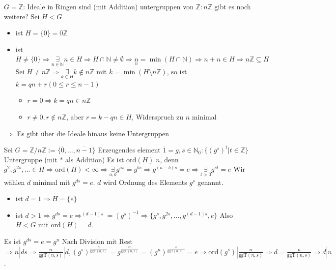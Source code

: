 \documentclass{article}
\newcommand{\N}{\mathbb{N}}
\newcommand{\Z}{\mathbb{Z}}
\newcommand{\ggT}{\text{ggT}}
\newcommand{\ord}{\text{ord}}
\begin{document}
$G=\Z$: Ideale in Ringen sind (mit Addition) untergruppen
von $\Z:n\Z$ gibt es noch weitere?
Sei $H<G$
\begin{itemize}
    \item ist $H=\{0\}=0\Z$
    \item ist $H\neq\{0\}\Rightarrow\underset{n\in\N}
        \exists n\in H\Rightarrow H\cap\N\neq\emptyset
        \Rightarrow\underset{n}n=\min(H\cap\N)
        \Rightarrow n+n\in H\Rightarrow n\Z\subseteq H$\\
        Sei $H\neq n\Z\Rightarrow\underset{k\in H}\exists
        k\notin n\Z$ mit $k=\min(H\setminus n\Z)$,
        so ist $k=qn+r(0\leq r\leq n-1)$
        \begin{itemize}
            \item $r=0\Rightarrow k=qn\in n\Z$
            \item $r\neq 0,r\notin n\Z$, aber
            $r=k-qn\in H$, Widerspruch zu $n$ minimal
        \end{itemize}
\end{itemize}
$\Rightarrow$ Es gibt über die Ideale hinaus keine
Untergruppen

Sei $G=\Z/n\Z:=\{\overline{0},\hdots,\overline{n-1}\}$
Erzeugendes element $\overline{1}=g,s\in\N_0:
\{(g^s)^t|t\in\Z\}$ Untergruppe (mit $*$ als Addition)
Es ist $\ord(H)|n$, denn $g^2,g^{2s},\hdots\in H\Rightarrow
\ord(H)<\infty\Rightarrow\underset{a,b}\exists g^{as}=g^{bs}
\Rightarrow g^{(a-b)s}=e\Rightarrow\underset{t>0}\exists
g^{st}=e$ Wir wählen $d$ minimal mit $g^{ds}=e$. $d$
wird Ordnung des Elements $g^{s}$ genannt.
\begin{itemize}
    \item ist $d=1\Rightarrow H=\{e\}$
    \item ist $d>1\Rightarrow g^{ds}=e\Rightarrow^{(d-1)s}
    =(g^s)^{-1}\Rightarrow\{g^s,g^{2s},\hdots,g^{(d-1)s},e\}$
    Also $H<G$ mit $\ord(H)=d$.
\end{itemize}
Es ist $g^{ds}=e=g^n$ Nach Division mit Rest
$\Rightarrow n|ds\Rightarrow \frac{n}{\ggT(n,s)}|d,
(g^s)^{\frac{n}{\ggT(n,s)}}=g^{\frac{sn}{\ggT(n,s)}}=
(g^n)^{\frac{s}{\ggT(n,s)}}=e\Rightarrow\ord(g^s)|\frac{n}
{\ggT(n,s)}\Rightarrow d=\frac{n}{\ggT(n,s)}
\Rightarrow d|n$.
\end{document}
